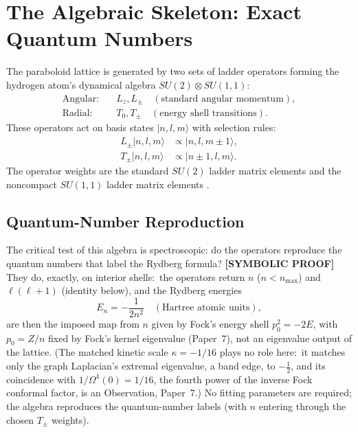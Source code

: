 \documentclass[aps,pra,twocolumn,superscriptaddress,longbibliography]{revtex4-2}
\begin{document}
\section{The Algebraic Skeleton: Exact Quantum Numbers}
\label{sec:algebra}

The paraboloid lattice is generated by two sets of ladder operators forming the hydrogen atom's dynamical algebra $SU(2) \otimes SU(1,1)$:
\begin{align}
\text{Angular:} \quad & L_z, L_\pm \quad (\text{standard angular momentum}), \\
\text{Radial:} \quad & T_0, T_\pm \quad (\text{energy shell transitions}).
\end{align}
These operators act on basis states $|n, l, m\rangle$ with selection rules:
\begin{align}
L_\pm |n, l, m\rangle &\propto |n, l, m \pm 1\rangle, \\
T_\pm |n, l, m\rangle &\propto |n \pm 1, l, m\rangle.
\end{align}
The operator weights are the standard $SU(2)$ ladder matrix elements \cite{biedenharn1981} and the noncompact $SU(1,1)$ ladder matrix elements \cite{barut1967}.

\subsection{Quantum-Number Reproduction}

The critical test of this algebra is spectroscopic: do the operators reproduce the quantum numbers that label the Rydberg formula? \textbf{[SYMBOLIC PROOF]} They do, exactly, on interior shells:\ the operators return $n$ ($n < n_{\max}$) and $\ell(\ell+1)$ (identity below), and the Rydberg energies
\begin{equation}
E_n = -\frac{1}{2n^2} \quad (\text{Hartree atomic units}),
\label{eq:rydberg}
\end{equation}
are then the imposed map from $n$ given by Fock's energy shell $p_0^2 = -2E$, with $p_0 = Z/n$ fixed by Fock's kernel eigenvalue (Paper~7), not an eigenvalue output of the lattice.  (The matched kinetic scale $\kappa = -1/16$ plays no role here:\ it matches only the graph Laplacian's extremal eigenvalue, a band edge, to $-\tfrac12$, and its coincidence with $1/\Omega^4(0) = 1/16$, the fourth power of the inverse Fock conformal factor, is an Observation, Paper~7.) No fitting parameters are required; the algebra reproduces the quantum-number labels (with $n$ entering through the chosen $T_\pm$ weights).
\end{document}
